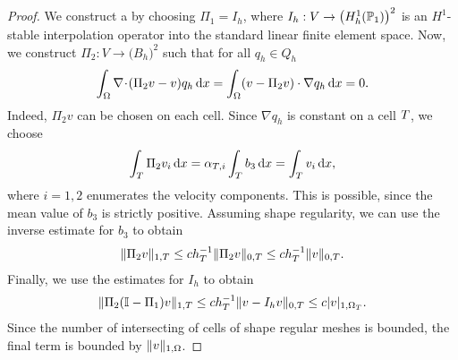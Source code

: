 \begin{proof}
  We construct a  by choosing
  $\Pi_1 = I_h$, where $I_h:V\to \bigl(H^1_h(\P_1)\bigr)^2$ is an
  $H^1$-stable interpolation operator into the standard linear finite
  element space. Now, we construct $\Pi_2: V \to \bigl(B_h\bigr)^2$
  such that for all $q_h\in Q_h$
  \begin{gather*}
    \int_\domain \div(\Pi_2 v-v) q_h \dx
    = \int_\domain (v-\Pi_2v)\cdot\nabla q_h\dx
    = 0.
  \end{gather*}
  Indeed, $\Pi_2 v$ can be chosen on each cell. Since $\nabla q_h$ is
  constant on a cell $\cell$, we choose
  \begin{gather*}
    \int_\cell \Pi_2 v_i \dx
    = \alpha_{\cell,i} \int_\cell b_3\dx
    = \int_\cell v_i\dx,
  \end{gather*}
  where $i=1,2$ enumerates the velocity components. This is possible,
  since the mean value of $b_3$ is strictly positive. Assuming shape
  regularity, we can use the inverse estimate for $b_3$ to obtain
  \begin{gather*}
    \norm{\Pi_2 v}_{1,\cell}
    \le c h_\cell^{-1} \norm{\Pi_2 v}_{0,\cell}
    \le c h_\cell^{-1} \norm{v}_{0,\cell}.
  \end{gather*}
  Finally, we use the estimates for $I_h$ to obtain
  \begin{gather*}
    \norm{\Pi_2 (\identity-\Pi_1) v}_{1,\cell}
    \le c h_\cell^{-1} \norm{v-I_h v}_{0,\cell}
    \le c \snorm{v}_{1,\domain_\cell}.
  \end{gather*}
  Since the number of intersecting of cells of shape regular meshes is
  bounded, the final term is bounded by $\norm v_{1,\domain}$.
\end{proof}

